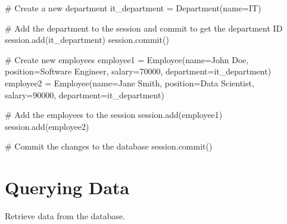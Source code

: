 \documentclass[
  letterpaper,
  DIV=11,
  numbers=noendperiod]{scrreprt}
\newenvironment{Shaded}{\begin{snugshade}}{\end{snugshade}}
\newcommand{\CommentTok}[1]{\textcolor[rgb]{0.37,0.37,0.37}{#1}}
\newcommand{\DecValTok}[1]{\textcolor[rgb]{0.68,0.00,0.00}{#1}}
\newcommand{\NormalTok}[1]{\textcolor[rgb]{0.00,0.23,0.31}{#1}}
\newcommand{\OperatorTok}[1]{\textcolor[rgb]{0.37,0.37,0.37}{#1}}
\newcommand{\StringTok}[1]{\textcolor[rgb]{0.13,0.47,0.30}{#1}}
\begin{document}
\begin{Shaded}
\begin{Highlighting}[]
\CommentTok{\# Create a new department}
\NormalTok{it\_department }\OperatorTok{=}\NormalTok{ Department(name}\OperatorTok{=}\StringTok{\textquotesingle{}IT\textquotesingle{}}\NormalTok{)}

\CommentTok{\# Add the department to the session and commit to get the department ID}
\NormalTok{session.add(it\_department)}
\NormalTok{session.commit()}

\CommentTok{\# Create new employees}
\NormalTok{employee1 }\OperatorTok{=}\NormalTok{ Employee(name}\OperatorTok{=}\StringTok{\textquotesingle{}John Doe\textquotesingle{}}\NormalTok{, position}\OperatorTok{=}\StringTok{\textquotesingle{}Software Engineer\textquotesingle{}}\NormalTok{, salary}\OperatorTok{=}\DecValTok{70000}\NormalTok{, department}\OperatorTok{=}\NormalTok{it\_department)}
\NormalTok{employee2 }\OperatorTok{=}\NormalTok{ Employee(name}\OperatorTok{=}\StringTok{\textquotesingle{}Jane Smith\textquotesingle{}}\NormalTok{, position}\OperatorTok{=}\StringTok{\textquotesingle{}Data Scientist\textquotesingle{}}\NormalTok{, salary}\OperatorTok{=}\DecValTok{90000}\NormalTok{, department}\OperatorTok{=}\NormalTok{it\_department)}

\CommentTok{\# Add the employees to the session}
\NormalTok{session.add(employee1)}
\NormalTok{session.add(employee2)}

\CommentTok{\# Commit the changes to the database}
\NormalTok{session.commit()}
\end{Highlighting}
\end{Shaded}

\section{Querying Data}\label{querying-data-2}

Retrieve data from the database.
\end{document}
